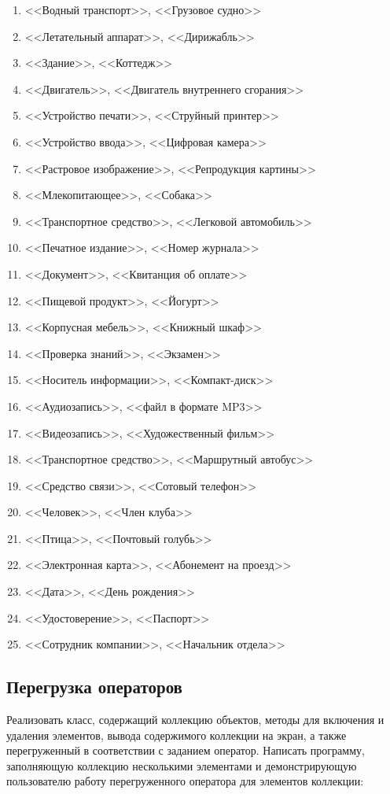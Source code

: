 \begin{enumerate}
\item <<Водный транспорт>>, <<Грузовое судно>>
\item <<Летательный аппарат>>, <<Дирижабль>>
\item <<Здание>>, <<Коттедж>>
\item <<Двигатель>>, <<Двигатель внутреннего сгорания>>
\item <<Устройство печати>>, <<Струйный принтер>>
\item <<Устройство ввода>>, <<Цифровая камера>>
\item <<Растровое изображение>>, <<Репродукция картины>>
\item <<Млекопитающее>>, <<Собака>>
\item <<Транспортное средство>>, <<Легковой автомобиль>>
\item <<Печатное издание>>, <<Номер журнала>>
\item <<Документ>>, <<Квитанция об оплате>>
\item <<Пищевой продукт>>, <<Йогурт>>
\item <<Корпусная мебель>>, <<Книжный шкаф>>
\item <<Проверка знаний>>, <<Экзамен>>
\item <<Носитель информации>>, <<Компакт-диск>>
\item <<Аудиозапись>>, <<файл в формате MP3>>
\item <<Видеозапись>>, <<Художественный фильм>>
\item <<Транспортное средство>>, <<Маршрутный автобус>>
\item <<Средство связи>>, <<Сотовый телефон>>
\item <<Человек>>, <<Член клуба>>
\item <<Птица>>, <<Почтовый голубь>>
\item <<Электронная карта>>, <<Абонемент на проезд>>
\item <<Дата>>, <<День рождения>>
\item <<Удостоверение>>, <<Паспорт>>
\item <<Сотрудник компании>>, <<Начальник отдела>>
\end{enumerate}
\subsection[Перегрузка операторов]{Перегрузка операторов}
Реализовать класс, содержащий коллекцию объектов, методы для включения и удаления элементов, вывода содержимого
коллекции на экран, а также перегруженный в соответствии с заданием оператор. Написать  программу, заполняющую
коллекцию несколькими элементами и демонстрирующую пользователю работу перегруженного оператора для элементов
коллекции:


